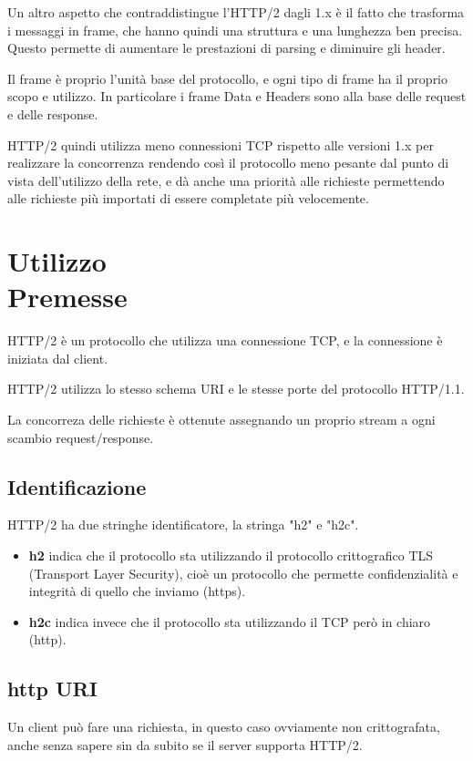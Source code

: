 \documentclass[12pt, a4paper]{article} %
\begin{document}
Un altro aspetto che contraddistingue l'HTTP/2 dagli 1.x è il fatto che trasforma i messaggi in frame, che hanno quindi una struttura e una lunghezza ben precisa. Questo permette di aumentare le prestazioni di parsing e diminuire gli header.

Il frame è proprio l'unità base del protocollo, e ogni tipo di frame ha il proprio scopo e utilizzo. In particolare i frame Data e Headers sono alla base delle request e delle response. 

HTTP/2 quindi utilizza meno connessioni TCP rispetto alle versioni 1.x per realizzare la concorrenza rendendo così il protocollo meno pesante dal punto di vista dell'utilizzo della rete, e dà anche una priorità alle richieste permettendo alle richieste più importati di essere completate più velocemente.

\section{Utilizzo \\[0.3cm] \large Premesse}

HTTP/2 è un protocollo che utilizza una connessione TCP, e la connessione è iniziata dal client.

HTTP/2 utilizza lo stesso schema URI e le stesse porte del protocollo HTTP/1.1.

La concorreza delle richieste è ottenute assegnando un proprio stream a ogni scambio request/response.

\subsection{Identificazione}
HTTP/2 ha due stringhe identificatore, la stringa "h2" e "h2c".

\begin{itemize}
    \item \textbf{h2} indica che il protocollo sta utilizzando il protocollo crittografico TLS (Transport Layer Security), cioè un protocollo che permette confidenzialità e integrità di quello che inviamo (https).
    \item \textbf{h2c} indica invece che il protocollo sta utilizzando il TCP però in chiaro (http).
\end{itemize}

\subsection{http URI}
Un client può fare una richiesta, in questo caso ovviamente non crittografata, anche senza sapere sin da subito se il server supporta HTTP/2.
\end{document}
